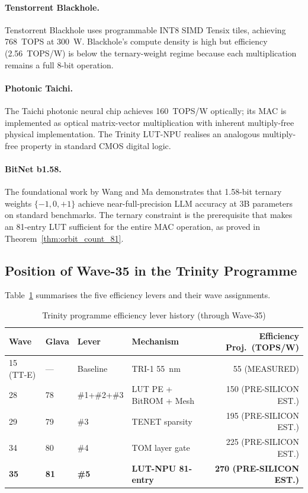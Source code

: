 \paragraph{Tenstorrent Blackhole.}  Tenstorrent Blackhole
\cite{tenstorrent_blackhole_2025} uses programmable INT8 SIMD Tensix tiles,
achieving 768~TOPS at 300~W.  Blackhole's compute density is high but
efficiency (2.56~TOPS/W) is below the ternary-weight regime because each
multiplication remains a full 8-bit operation.

\paragraph{Photonic Taichi.}  The Taichi photonic neural chip
\cite{photonic_taichi_2024} achieves 160~TOPS/W optically; its MAC is
implemented as optical matrix-vector multiplication with inherent
multiply-free physical implementation.  The Trinity LUT-NPU realises
an analogous multiply-free property in standard CMOS digital logic.

\paragraph{BitNet b1.58.}  The foundational work by Wang and Ma
\cite{bitnet_b158_2024} demonstrates that 1.58-bit ternary weights
\(\{-1, 0, +1\}\) achieve near-full-precision LLM accuracy at 3B parameters
on standard benchmarks.  The ternary constraint is the prerequisite that
makes an 81-entry LUT sufficient for the entire MAC operation, as proved
in Theorem~\ref{thm:orbit_count_81}.

\subsection{Position of Wave-35 in the Trinity Programme}

Table~\ref{tab:prior_work_position_w35} summarises the five efficiency
levers and their wave assignments.

\begin{table}[ht]
\centering
\caption{Trinity programme efficiency lever history (through Wave-35)}
\label{tab:prior_work_position_w35}
\begin{tabular}{llllr}
\hline
Wave & Glava & Lever & Mechanism & Efficiency Proj.\ (TOPS/W) \\
\hline
15 (TT-E) & --- & Baseline & TRI-1 55~nm & 55 (MEASURED) \\
28 & 78 & \#1+\#2+\#3 & LUT PE + BitROM + Mesh & 150 (PRE-SILICON EST.) \\
29 & 79 & \#3 & TENET sparsity & 195 (PRE-SILICON EST.) \\
34 & 80 & \#4 & TOM layer gate & 225 (PRE-SILICON EST.) \\
\textbf{35} & \textbf{81} & \textbf{\#5} & \textbf{LUT-NPU 81-entry} & \textbf{270 (PRE-SILICON EST.)} \\
\hline
\end{tabular}
\end{table}

